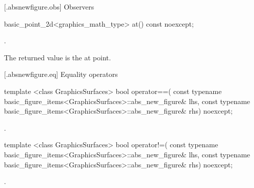  [\iotwod.absnewfigure.obs] {Observers}%

%
\begin{itemdecl}
basic_point_2d<graphics_math_type> at() const noexcept;
\end{itemdecl}
\begin{itemdescr}
\pnum
\returns {}.

\pnum
\remarks
The returned value is the at point.
\end{itemdescr}

 [\iotwod.absnewfigure.eq] {Equality operators}%

%
\begin{itemdecl}
template <class GraphicsSurfaces>
bool operator==(
  const typename basic_figure_items<GraphicsSurfaces>::abs_new_figure& lhs,
  const typename basic_figure_items<GraphicsSurfaces>::abs_new_figure& rhs) 
  noexcept;
\end{itemdecl}
\begin{itemdescr}
\pnum
\returns {}.
\end{itemdescr}

%
\begin{itemdecl}
template <class GraphicsSurfaces>
bool operator!=(
  const typename basic_figure_items<GraphicsSurfaces>::abs_new_figure& lhs,
  const typename basic_figure_items<GraphicsSurfaces>::abs_new_figure& rhs) 
  noexcept;
\end{itemdecl}
\begin{itemdescr}
\pnum
\returns {}.
\end{itemdescr}
